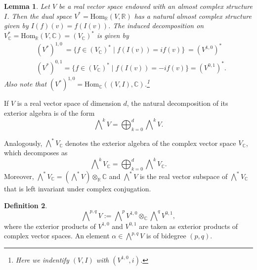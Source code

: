 \documentclass{article}
\theoremstyle{definition}
\newtheorem{definition}{Definition}[subsection]
\theoremstyle{plain}
\newtheorem{lemma}[definition]{Lemma}
\begin{document}
\begin{lemma}
    Let $ V $ be a real vector space endowed with an almost complex structure $ I $. Then the dual space $ V^{*}=\mathrm{Hom}_{\mathbb{R}}(V,\mathbb{R}) $ has a natural almost complex structure given by $ I(f)(v)=f(I(v)) $. The induced decomposition on $ V^{*}_{\mathbb{C}}=\mathrm{Hom}_{\mathbb{R}}(V,\mathbb{C})=(V_{\mathbb{C}})^{*} $ is given by \begin{align*}
        &(V^{*})^{1,0}\ =\{f\in (V_{\mathbb{C}})^{*}\mid f(I(v))=if(v)\}\ =(V^{1,0})^{*}\\
        &(V^{*})^{0,1}=\{f\in (V_{\mathbb{C}})^{*}\mid f(I(v))=-if(v)\}=(V^{0,1})^{*}.
    \end{align*}
    Also note that $ (V^{*})^{1,0}=\mathrm{Hom}_{\mathbb{C}}((V,I),\mathbb{C}) $.\footnote{Here we indentify $ (V,I) $ with $ (V^{1,0},i) $.}
\end{lemma}

If $ V $ is a real vector space of dimension $ d $, the natural decomposition of its exterior algebra is of the form\[
    \bigwedge\nolimits^k V=\bigoplus_{k=0}^{d}\bigwedge\nolimits^k V.
\] 

Analogously, $ \bigwedge^{*}V_{\mathbb{C}} $ denotes the exterior algebra of the complex vector space $ V_{\mathbb{C}} $, which decomposes as\begin{equation}
    \bigwedge\nolimits^k V_{\mathbb{C}}=\bigoplus_{k=0}^{d}\bigwedge\nolimits^k V_{\mathbb{C}}.\label{hhh}
\end{equation}Moreover, $ \bigwedge^{*}V_{\mathbb{C}}=(\bigwedge^{*}V)\otimes_{\mathbb{R}}\mathbb{C} $ and $ \bigwedge^{*}V $ is the real vector subspace of $ \bigwedge^{*}V_{\mathbb{C}} $ that is left invariant under complex conjugation.

\begin{definition}
    \[
        \bigwedge\nolimits^{p,q}V:=\bigwedge\nolimits^p V^{1,0}\otimes_{\mathbb{C}}\bigwedge\nolimits^q V^{0,1},
    \]where the exterior products of $ V^{1,0} $ and $ V^{0,1} $ are taken as exterior products of complex vector spaces. An element $ \alpha \in \bigwedge^{p,q}V $ is of bidegree $ (p,q) $.
\end{definition}
\end{document}
